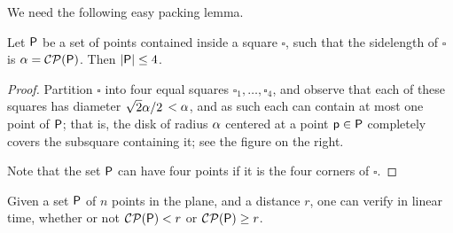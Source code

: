 We need the following easy packing lemma.


\begin{lemma}%
    Let ${\mathsf{P}}$ be a set of points contained inside a square $\square$,
    such that the sidelength of $\square$ is
    $\alpha = \mathcal{CP} ({{\mathsf{P}}} )$. Then $\left| {{\mathsf{P}}} \right| \leq 4$.
\begin{figure}[h]
    \centering
    {}%
    \caption{}
\end{figure}
\end{lemma}
   

\begin{proof}
    Partition $\square$ into four equal squares
    $\square_1,\ldots, \square_4$, and observe that each of these squares has diameter
    $\sqrt{2} \alpha/2$ $ < \alpha$, and as such each can contain at most one
    point of ${\mathsf{P}}$; that is, the disk of radius $\alpha$ centered at a
    point $\mathsf{p} \in {\mathsf{P}}$ completely covers the subsquare containing it;
    see the figure on the right.
       
    Note that the set ${\mathsf{P}}$ can have four points if it is the four
    corners of $\square$.
\end{proof}%


\begin{lemma}
    Given a set ${\mathsf{P}}$ of $n$ points in the plane, and a distance $r$,
    one can verify in linear time, whether or not $\mathcal{CP}({\mathsf{P}}) <
    r$ or $\mathcal{CP}({\mathsf{P}}) \geq r$.
\end{lemma}

